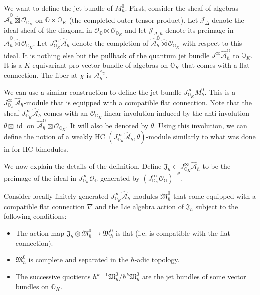 \documentclass[12pt]{amsart}
\newcommand{\A}{\mathcal{A}}
\newcommand{\Orb}{\mathbb{O}}
\newcommand{\Str}{\mathcal{O}}
\newcommand{\jet}{J^\infty}
\theoremstyle{definition}
\numberwithin{equation}{section}
\begin{document}
We want to define the jet bundle of $M_\hbar^0$.  First,
consider the  sheaf of algebras $\hat{\A}_\hbar^{\Orb}\widehat{\boxtimes} \Str_{\Orb_K}$ on $\Orb\times \Orb_K$ (the completed outer tensor product).
Let $\mathcal{J}_\Delta$ denote the ideal sheaf of the diagonal in $\Str_{\Orb}\boxtimes
\Str_{\Orb_K}$ and let $\mathcal{J}_{\Delta,\hbar}$ denote its preimage in
$\hat{\A}_\hbar^{\Orb}\widehat{\boxtimes} \Str_{\Orb_K}$. Let $\jet_{\Orb_K} \hat{\A}_\hbar$
denote the completion of  $\hat{\A}_\hbar^{\Orb}\widehat{\boxtimes} \Str_{\Orb_K}$ with respect to
this ideal. It is nothing else but the pullback of the quantum jet bundle $\jet \hat{\A}_\hbar^{\Orb}$
to $\Orb_K$. It is a $K$-equivariant pro-vector bundle of algebras on $\Orb_K$ that comes with a flat
connection. The fiber at $\chi$ is $\A_\hbar^{\wedge_\chi}$.

We can use a similar construction to define the jet bundle $\jet_{\Orb_K} M_\hbar^0$.
This is a $\jet_{\Orb_K} \hat{\A}_\hbar$-module that is equipped with a compatible flat connection.
Note that the sheaf $\jet_{\Orb_K} \hat{\A}_\hbar$ comes with an $\Str_{\Orb_K}$-linear
involution induced by the anti-involution $\theta\boxtimes \operatorname{id}$
on $\hat{\A}_\hbar^{\Orb}\boxtimes \Str_{\Orb_K}$. It will also be denoted by $\theta$. Using this
involution, we can define the notion of a weakly HC $(\jet_{\Orb_K} \hat{\A}_\hbar,\theta)$-module
similarly to what was done in \cite[Section 2.6]{HC_symp} for HC bimodules.

We now explain the details of the definition.
Define $\mathfrak{J}_\hbar\subset \jet_{\Orb_K} \hat{\A}_\hbar$ to be the preimage of the
ideal in $\jet_{\Orb_K} \mathcal{O}_\Orb$ generated by $(\jet_{\Orb_K} \mathcal{O}_\Orb)^{-\theta}$.

Consider locally finitely generated
$\jet_{\Orb_K} \hat{\A}_\hbar$-modules $\mathfrak{M}^0_\hbar$ that come equipped with a compatible
flat connection $\nabla$ and the Lie algebra action of $\mathfrak{J}_\hbar$ subject
to the following conditions:

\begin{itemize}
\item[(i)] The action map $\mathfrak{J}_\hbar\otimes \mathfrak{M}^0_\hbar\rightarrow
\mathfrak{M}^0_\hbar$ is flat (i.e. is compatible with the flat connection).
\item[(ii)] $\mathfrak{M}^0_\hbar$ is complete and separated in the $\hbar$-adic topology.
\item[(iii)] The successive quotients $\hbar^{k-1}\mathfrak{M}^0_\hbar/\hbar^k \mathfrak{M}^0_\hbar$
are the jet bundles of some vector bundles on $\Orb_K$.
\end{itemize}
\end{document}
